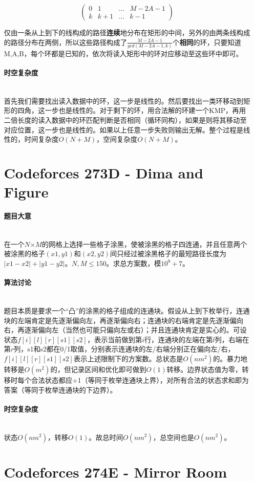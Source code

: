 \documentclass[UTF8]{ctexart}
\newcommand{\myparagraph}[1]{\paragraph{#1}\mbox{}\\}
\theoremstyle{nonumberplain}
\begin{document}
			$$\begin{pmatrix} 0 & 1 & ... & M-2A-1 \\ k & k+1 & ... & k-1 \end{pmatrix}$$
			
			仅由一条从上到下的线构成的路径\textbf{连续}地分布在矩形的中间，另外的由两条线构成的路径分布在两侧，所以这些路径构成了$\frac{M-2A-1}{gcd(M-2A-1,k)}$个\textbf{相同}的环，只要知道M,A,B，每个环都是已知的，依次将读入矩形中的环对应移动至这些环中即可。
		
		\myparagraph{时空复杂度}
		
			首先我们需要找出读入数据中的环，这一步是线性的。然后要找出一类环移动到矩形的四角，这一步也是线性的。对于剩下的环，用合法解的环建一个KMP，再用二倍长度的读入数据中的环匹配判断是否相同（循环同构），如果是则将其移动至对应位置，这一步也是线性的。如果以上任意一步失败则输出无解。整个过程是线性的，时间复杂度$O(N+M)$，空间复杂度$O(N+M)$。
	
	\section{Codeforces 273D - Dima and Figure}
	
		\myparagraph{题目大意}
		
			在一个$N$×$M$的网格上选择一些格子涂黑，使被涂黑的格子四连通，并且任意两个被涂黑的格子$(x1,y1)$和$(x2,y2)$间只经过被涂黑格子的最短路径长度为$|x1-x2|+|y1-y2|$。$N,M \leq 150$。求总方案数，模$10^9+7$。
		
		\myparagraph{算法讨论}
		
			题目本质是要求一个“凸”的涂黑的格子组成的连通块。假设从上到下枚举行，连通块的左端肯定是先逐渐偏向左，再逐渐偏向右；连通块的右端肯定是先逐渐偏向右，再逐渐偏向左（当然也可能只偏向左或右）；并且连通块肯定是实心的。可设状态$f[i][l][r][s1][s2]$，表示当前做到第$i$行，连通块的左端在第$l$列，右端在第$r$列，s1和s2都在0/1取值，分别表示连通块的左/右端分别正在偏向左/右，$f[i][l][r][s1][s2]$表示上述限制下的方案数。总状态是$O(nm^2)$的。暴力地转移是$O(m^2)$的，但记录区间和优化即可做到$O(1)$转移。边界状态值为零，转移时每个合法状态都应+1（等同于枚举连通块上界），对所有合法的状态求和即为答案（等同于枚举连通块的下边界）。
		
		\myparagraph{时空复杂度}
		
			状态$O(nm^2)$，转移$O(1)$。故总时间$O(nm^2)$，总空间也是$O(nm^2)$。
	
	\section{Codeforces 274E - Mirror Room}
		
\end{document}
